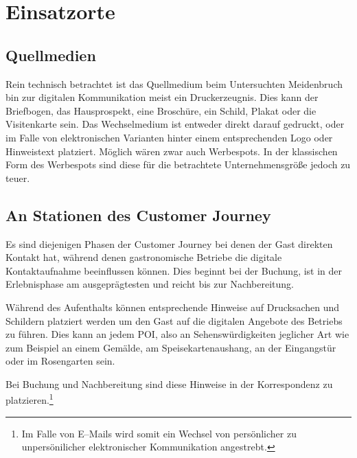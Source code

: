 
\section{Einsatzorte} %
\label{sec:einsatzorte}

\subsection{Quellmedien} %
\label{sub:quellmedien}
Rein technisch betrachtet ist das Quellmedium beim Untersuchten Meidenbruch bin zur digitalen Kommunikation meist ein Druckerzeugnis. Dies kann der Briefbogen, das Hausprospekt, eine Broschüre, ein Schild, Plakat oder die Visitenkarte sein. Das Wechselmedium ist entweder direkt darauf gedruckt, oder im Falle von elektronischen Varianten hinter einem entsprechenden Logo oder Hinweistext platziert. Möglich wären zwar auch Werbespots. In der klassischen Form des Werbespots sind diese für die betrachtete  Unternehmensgröße jedoch zu teuer.


\subsection{An Stationen des Customer Journey} %
\label{sub:stationen_des_customer_journey}
Es sind diejenigen Phasen der Customer Journey bei denen der Gast direkten Kontakt hat, während denen gastronomische Betriebe die digitale Kontaktaufnahme beeinflussen können. Dies beginnt bei der Buchung, ist in der Erlebnisphase am ausgeprägtesten und reicht bis zur Nachbereitung.

Während des Aufenthalts können entsprechende Hinweise auf Drucksachen und Schildern platziert werden um den Gast auf die digitalen Angebote des Betriebs zu führen. Dies kann an jedem \ac{POI}, also an Sehenswürdigkeiten jeglicher Art wie zum Beispiel an einem Gemälde, am Speisekartenaushang, an der Eingangstür oder im Rosengarten sein.

Bei Buchung und Nachbereitung sind diese Hinweise in der Korrespondenz zu platzieren.\footnote{Im Falle von E–Mails wird somit ein Wechsel von persönlicher zu unpersönilicher elektronischer Kommunikation angestrebt.}

